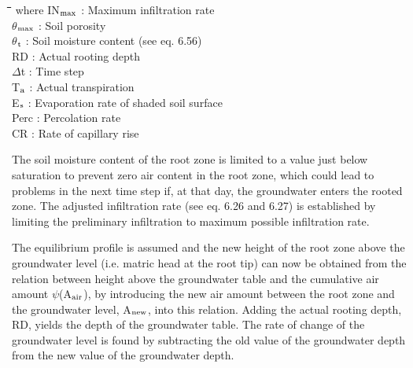 \documentclass[11pt]{article}
\begin{document}
\nwln
\begin{tabbing}
\hspace{1.27cm}\=\hspace{1.27cm}\=\hspace{1.27cm}\=\hspace{1.27cm}\=%
\hspace{1.27cm}\=\hspace{1.27cm}\=\hspace{1.27cm}\=\hspace{1.27cm}\=%
\hspace{1.27cm}\=\hspace{1.27cm}\=\kill
where\> IN$_{{\rm max}}$\> : Maximum infiltration rate\> \> \> \> \> \> \> \> [cm d$^{{\rm -1}}$]\\
\>$\theta$$_{{\rm max}}$\> : Soil porosity\> \> \> \> \> \> \> \> [cm$^{{\rm 3}}$ cm$^{{\rm -3}}$]\\
\>$\theta$$_{{\rm t}}$\> : Soil moisture content (see eq. 6.56)\> \> \> \> \> \> \> \> [cm$^{{\rm 3}}$ cm$^{{\rm -3}}$]\\
\>RD\> : Actual rooting depth\> \> \> \> \> \> \> \> [cm]\\
\>$\Delta$t\> : Time step\> \> \> \> \> \> \> \> [d]\\
\>T$_{{\rm a}}$\> : Actual transpiration\> \> \> \> \> \> \> \> [cm d$^{{\rm -1}}$]\\
\>E$_{{\rm s}}$\> : Evaporation rate of shaded soil surface\> \> \> \> \> \> \> \> [cm d$^{{\rm -1}}$]\\
\>Perc\> : Percolation rate\> \> \> \> \> \> \> \> [cm d$^{{\rm -1}}$]\\
\>CR\> : Rate of capillary rise\> \> \> \> \> \> \> \> [cm d$^{{\rm -1}}$]
\end{tabbing}

\bigskip
The soil moisture content of the root zone is limited to a value just below saturation to
prevent zero air content in the root zone, which could lead to problems in the next time
step if, at that day, the groundwater enters the rooted zone. The adjusted infiltration rate
(see eq. 6.26 and 6.27) is established by limiting the preliminary infiltration to maximum
possible infiltration rate.

\bigskip
\bigskip
The equilibrium profile is assumed and the new height of the root zone above the
groundwater level (i.e. matric head at the root tip) can now be obtained from the relation
between height above the groundwater table and the cumulative air amount $\psi$(A$_{{\rm air}}$), by
introducing the new air amount between the root zone and the groundwater level, A$_{{\rm new}}$,
into this relation. Adding the actual rooting depth, RD, yields the depth of the groundwa\-ter table. The rate of change of the groundwater level is found by subtracting the old
value of the groundwater depth from the new value of the groundwater depth. 
\end{document}
